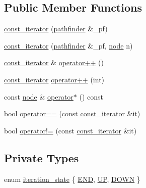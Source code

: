 \subsection*{Public Member Functions}
\begin{DoxyCompactItemize}
\item 
\mbox{\hyperlink{classpathfinder_1_1const__iterator_a8766a7016c300cbbe9c5f8fa61ec44d1}{const\+\_\+iterator}} (\mbox{\hyperlink{classpathfinder}{pathfinder}} \&\+\_\+pf)
\item 
\mbox{\hyperlink{classpathfinder_1_1const__iterator_acbaabfa04503076ff34db02d03c2e05e}{const\+\_\+iterator}} (\mbox{\hyperlink{classpathfinder}{pathfinder}} \&\+\_\+pf, \mbox{\hyperlink{classnode}{node}} n)
\item 
\mbox{\hyperlink{classpathfinder_1_1const__iterator}{const\+\_\+iterator}} \& \mbox{\hyperlink{classpathfinder_1_1const__iterator_acc71bfba7f3318446d97cf058871b015}{operator++}} ()
\item 
\mbox{\hyperlink{classpathfinder_1_1const__iterator}{const\+\_\+iterator}} \mbox{\hyperlink{classpathfinder_1_1const__iterator_a1ed8257e9acb6d55cfc49753a134ac9f}{operator++}} (int)
\item 
const \mbox{\hyperlink{classnode}{node}} \& \mbox{\hyperlink{classpathfinder_1_1const__iterator_a71d37d3c7f9e5301eaa5fe995877613a}{operator$\ast$}} () const
\item 
bool \mbox{\hyperlink{classpathfinder_1_1const__iterator_aa4ed66f83b966672c7beb112d1266459}{operator==}} (const \mbox{\hyperlink{classpathfinder_1_1const__iterator}{const\+\_\+iterator}} \&it)
\item 
bool \mbox{\hyperlink{classpathfinder_1_1const__iterator_a350c813ed1fbaa12cb90e459819894d0}{operator!=}} (const \mbox{\hyperlink{classpathfinder_1_1const__iterator}{const\+\_\+iterator}} \&it)
\end{DoxyCompactItemize}
\subsection*{Private Types}
\begin{DoxyCompactItemize}
\item 
enum \mbox{\hyperlink{classpathfinder_1_1const__iterator_a0f4ffc8bec85488c37e68ddb247e6e47}{iteration\+\_\+state}} \{ \mbox{\hyperlink{classpathfinder_1_1const__iterator_a0f4ffc8bec85488c37e68ddb247e6e47a2766dd79e176eb5bd63593b547e6364a}{E\+ND}}, 
\mbox{\hyperlink{classpathfinder_1_1const__iterator_a0f4ffc8bec85488c37e68ddb247e6e47a4670c4ef84626de9e51910103fe0bef0}{UP}}, 
\mbox{\hyperlink{classpathfinder_1_1const__iterator_a0f4ffc8bec85488c37e68ddb247e6e47abaea1055328f5b5d634d4aa2747028e7}{D\+O\+WN}}
 \}
\end{DoxyCompactItemize}
